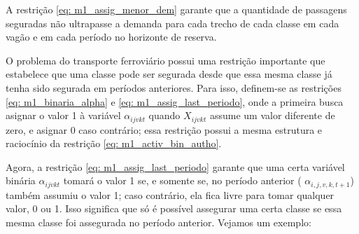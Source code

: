 A restrição \ref{eq: m1_assig_menor_dem} garante que a quantidade de passagens seguradas não ultrapasse a demanda para cada trecho de cada classe em cada vagão e em cada período no horizonte de reserva.

O problema do transporte ferroviário possui uma restrição importante que estabelece que uma classe pode ser segurada desde que essa mesma classe já tenha sido segurada em períodos anteriores. Para isso, definem-se as restrições \ref{eq: m1_binaria_alpha} e \ref{eq: m1_assig_last_periodo}, onde a primeira busca asignar o valor 1 à variável $\alpha_{ijvkt}$ quando $X_{ijvkt}$ assume um valor diferente de zero, e asignar 0 caso contrário; essa restrição possui a mesma estrutura e raciocínio da restrição \ref{eq: m1_activ_bin_autho}.

Agora, a restrição \ref{eq: m1_assig_last_periodo} garante que uma certa variável binária $\alpha_{ijvkt}$ tomará o valor 1 se, e somente se, no período anterior ( $\alpha_{i,j,v,k,t+1}$) também assumiu o valor 1; caso contrário, ela fica livre para tomar qualquer valor, 0 ou 1. Isso significa que só é possível assegurar uma certa classe se essa mesma classe foi assegurada no período anterior. Vejamos um exemplo:


